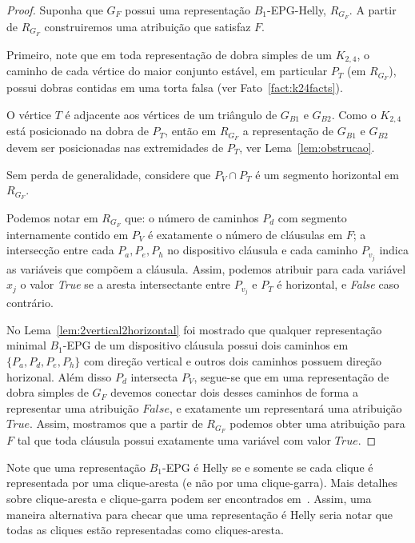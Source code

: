\begin{proof}
Suponha que $G_F$ possui uma representação $B_1$-EPG-Helly, $R_{G_F}$. A partir de $R_{G_F}$ construiremos uma atribuição que satisfaz $F$. 

Primeiro, note que em toda representação de dobra simples de um $K_{2,4}$, o caminho de cada vértice do maior conjunto estável, em particular $P_{T}$ (em $R_{G_F}$), possui dobras contidas em uma torta falsa (ver Fato~\ref{fact:k24facts}). 


O vértice  $T$ é adjacente aos vértices de um triângulo de  $G_{B1}$ e $G_{B2}$. Como o $K_{2,4}$ está posicionado na dobra de  $P_{T}$, então em $R_{G_F}$ a representação de $G_{B1}$ e $G_{B2}$ devem ser posicionadas nas extremidades de $P_{T}$, ver Lema~\ref{lem:obstrucao}.   


Sem perda de generalidade, considere que $P_{V} \cap P_{T}$ é um segmento horizontal em $R_{G_F}$.

Podemos notar em $R_{G_F}$ que: o número de caminhos $P_{d}$ com segmento internamente contido em  $P_{V}$ é exatamente o número de cláusulas em $F$; a intersecção entre cada  $P_{a}, P_{e}, P_{h}$ no  dispositivo cláusula e cada caminho $P_{v_j}$ indica as variáveis que compõem a cláusula. Assim, podemos atribuir para cada variável $ x_{j}$ o valor \textit{True} se a aresta intersectante entre $P_{v_j}$ e $P_{T}$ é horizontal, e \textit{False} caso contrário. 


No Lema~\ref{lem:2vertical2horizontal} foi mostrado que qualquer representação minimal $B_1$-EPG de um dispositivo cláusula possui dois caminhos em $\{P_{a}, P_{d}, P_{e}, P_{h}\}$ com direção vertical e outros dois caminhos possuem direção horizonal. Além disso $P_{d}$ intersecta $P_{V}$, segue-se que em uma representação de dobra simples de  $G_F$ devemos conectar dois desses caminhos de forma a representar uma atribuição $False$, e exatamente um representará uma atribuição $True$. Assim, mostramos que a partir de $R_{G_F}$ podemos obter uma atribuição para $F$ tal que toda cláusula possui exatamente uma variável com valor $True$.
 \end{proof}


Note que uma representação $B_1$-EPG é  Helly se e somente se cada clique é representada por uma  clique-aresta (e não por uma  clique-garra). Mais detalhes sobre clique-aresta e clique-garra podem ser encontrados em~\cite{golumbic2009}. Assim, uma maneira alternativa para checar que uma representação é Helly seria notar que todas as cliques estão representadas como cliques-aresta.

